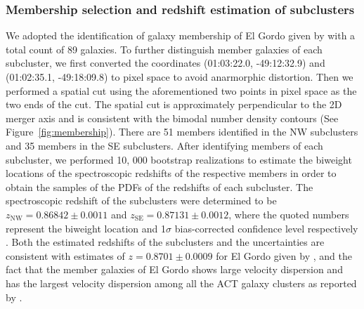 \subsubsection{Membership selection and redshift estimation of subclusters}
We adopted the identification of galaxy membership of El Gordo given by
 with a total count of 89 galaxies.
To further distinguish member galaxies of each subcluster, we first
converted the coordinates (01:03:22.0,
-49:12:32.9) and (01:02:35.1, -49:18:09.8) to pixel space to
avoid anarmorphic distortion. Then we performed a spatial cut using the
aforementioned two points in pixel space as the two ends of the cut. The
spatial cut is approximately perpendicular to the 2D merger axis and is consistent with
the bimodal number density contours (See Figure~\ref{fig:membership}). 
There are 51 members identified in the NW subclusters and 35 members in the SE
subclusters. 
After identifying members of each subcluster, we performed 10, 000 bootstrap realizations to estimate the biweight
locations of the spectroscopic redshifts of the respective members in order
to obtain the samples of the PDFs of the redshifts of each subcluster. 
The spectroscopic redshift of the subclusters were
determined to be 
$z_{\mathrm{NW}} = 0.86842 \pm 0.0011$ and 
$z_{\mathrm{SE}} = 0.87131 \pm 0.0012$, where the quoted numbers represent the
biweight location and 1$\sigma$ bias-corrected confidence level
respectively \citep{Beers90}.  
Both the estimated redshifts of the subclusters and the uncertainties are
consistent with estimates of $z=0.8701 \pm 0.0009$ for El Gordo given by \citealt{Sifon13}, and the fact that the
member galaxies of El
Gordo shows large velocity dispersion and has the largest velocity
dispersion among all the ACT galaxy clusters as reported by
.

